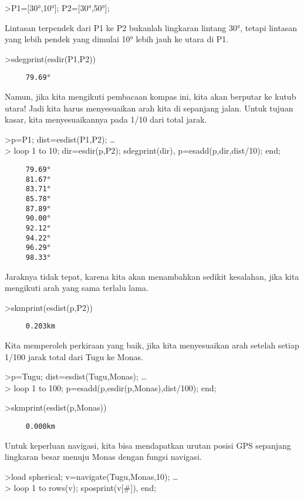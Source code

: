 \documentclass[
]{book}
\begin{document}
\textgreater P1={[}30°,10°{]}; P2={[}30°,50°{]};

Lintasan terpendek dari P1 ke P2 bukanlah lingkaran lintang 30°, tetapi lintasan yang lebih pendek yang dimulai 10° lebih jauh ke utara di P1.

\textgreater sdegprint(esdir(P1,P2))

\begin{verbatim}
     79.69°
\end{verbatim}

Namun, jika kita mengikuti pembacaan kompas ini, kita akan berputar ke kutub utara! Jadi kita harus menyesuaikan arah kita di sepanjang jalan. Untuk tujuan kasar, kita menyesuaikannya pada 1/10 dari total jarak.

\textgreater p=P1; dist=esdist(P1,P2); \ldots{}\\
\textgreater{} loop 1 to 10; dir=esdir(p,P2); sdegprint(dir), p=esadd(p,dir,dist/10); end;

\begin{verbatim}
     79.69°
     81.67°
     83.71°
     85.78°
     87.89°
     90.00°
     92.12°
     94.22°
     96.29°
     98.33°
\end{verbatim}

Jaraknya tidak tepat, karena kita akan menambahkan sedikit kesalahan, jika kita mengikuti arah yang sama terlalu lama.

\textgreater skmprint(esdist(p,P2))

\begin{verbatim}
     0.203km
\end{verbatim}

Kita memperoleh perkiraan yang baik, jika kita menyesuaikan arah setelah setiap 1/100 jarak total dari Tugu ke Monas.

\textgreater p=Tugu; dist=esdist(Tugu,Monas); \ldots{}\\
\textgreater{} loop 1 to 100; p=esadd(p,esdir(p,Monas),dist/100); end;

\textgreater skmprint(esdist(p,Monas))

\begin{verbatim}
     0.000km
\end{verbatim}

Untuk keperluan navigasi, kita bisa mendapatkan urutan posisi GPS sepanjang lingkaran besar menuju Monas dengan fungsi navigasi.

\textgreater load spherical; v=navigate(Tugu,Monas,10); \ldots{}\\
\textgreater{} loop 1 to rows(v); sposprint(v{[}\#{]}), end;
\end{document}
